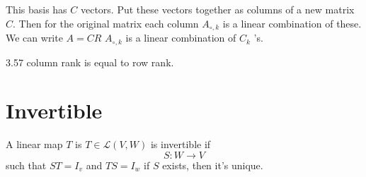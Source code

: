 \documentclass[letter]{article}
\begin{document}
This basis has $C$ vectors. Put these vectors together as columns of a new matrix $C$. Then for the original matrix each column $A_{\circ, k}$ is a linear combination of these. We can write $A = CR$ $A_{\circ, k}$ is a linear combination of $C_k$ 's. 

3.57 column rank is equal to row rank.


\section*{Invertible}
A linear map $T$ is $T \in \mathcal L (V, W)$ is invertible if 
\[
S: W \to V
\]
such that $ST = I_v$ and $TS = I_w$ if $S$ exists, then it's unique. 
\end{document}
